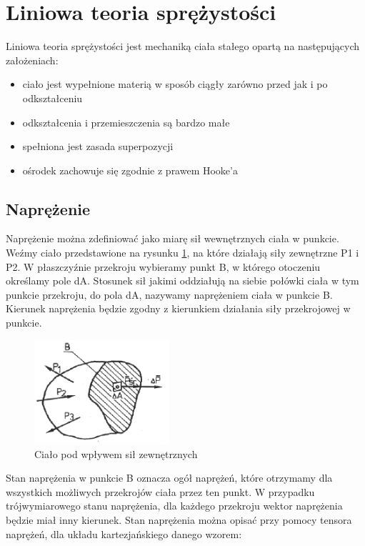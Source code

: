 
\section{Liniowa teoria sprężystości}
\label{sec:liniowa_teoria_sprezystosci}

Liniowa teoria sprężystości jest mechaniką ciała stałego opartą na następujących założeniach:
\begin{itemize}
  \item ciało jest wypełnione materią w sposób ciągły zarówno przed jak i po odkształceniu
  \item odkształcenia i przemieszczenia są bardzo małe
  \item spełniona jest zasada superpozycji
  \item ośrodek zachowuje się zgodnie z prawem Hooke'a
\end{itemize}

\subsection{Naprężenie}
\label{sec:naprezenie}

Naprężenie można zdefiniować jako miarę sił wewnętrznych ciała w punkcie. Weźmy ciało przedstawione na rysunku \ref{fig:potato}, na które działają siły zewnętrzne P1 i P2. W płaszczyźnie przekroju wybieramy punkt B, w którego otoczeniu określamy pole dA. Stosunek sił jakimi oddziałują na siebie połówki ciała w tym punkcie przekroju, do pola dA, nazywamy naprężeniem ciała w punkcie B. Kierunek naprężenia będzie zgodny z kierunkiem działania siły przekrojowej w punkcie.

\begin{figure}[h]
\centering
\includegraphics[width=5cm]{Zdjecia/2/potato}
\caption{Ciało pod wpływem sił zewnętrznych \cite{bartek_wolny}}
\label{fig:potato}
\end{figure}

Stan naprężenia w punkcie B oznacza ogół naprężeń, które otrzymamy dla wszystkich możliwych przekrojów ciała przez ten punkt.
W przypadku trójwymiarowego stanu naprężenia, dla każdego przekroju wektor naprężenia będzie miał inny kierunek. Stan naprężenia można opisać przy pomocy tensora naprężeń, dla układu kartezjańskiego danego wzorem:


